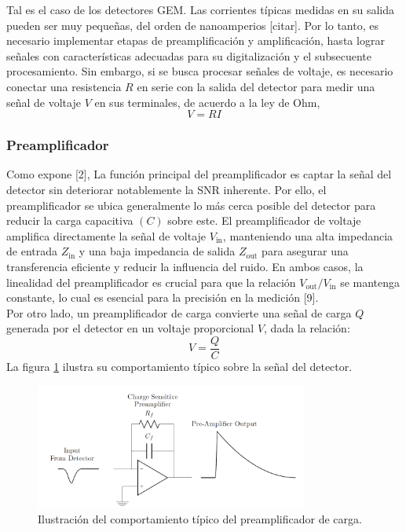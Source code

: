 \documentclass[]{book}
\begin{document}
\noindent Tal es el caso de los detectores GEM. Las corrientes típicas medidas en su salida pueden ser muy pequeñas, del orden de nanoamperios [citar]. Por lo tanto, es necesario implementar etapas de preamplificación y amplificación, hasta lograr señales con características adecuadas para su digitalización y el subsecuente procesamiento. Sin embargo, si se busca procesar señales de voltaje, es necesario conectar una resistencia $R$ en serie con la salida del detector para medir una señal de voltaje $V$ en sus terminales, de acuerdo a la ley de Ohm, $$V = R I$$ 

\subsubsection{Preamplificador}

\noindent Como expone [2], La función principal del preamplificador es captar la señal del detector sin deteriorar notablemente la SNR inherente. Por ello, el preamplificador se ubica generalmente lo más cerca posible del detector para reducir la carga capacitiva $(C)$ sobre este. El preamplificador de voltaje amplifica directamente la señal de voltaje $V_{\text{in}}$, manteniendo una alta impedancia de entrada $Z_{\text{in}}$ y una baja impedancia de salida $Z_{\text{out}}$ para asegurar una transferencia eficiente y reducir la influencia del ruido. En ambos casos, la linealidad del preamplificador es crucial para que la relación $V_{\text{out}}/ V_{\text{in}}$ se mantenga constante, lo cual es esencial para la precisión en la medición [9].\\

\noindent Por otro lado, un preamplificador de carga convierte una señal de carga $Q$ generada por el detector en un voltaje proporcional $V$, dada la relación: $$V = \frac{Q}{C}$$ La figura \ref{fig:preamp} ilustra su comportamiento típico sobre la señal del detector.\\

\begin{figure}[h]
    \centering
    \includegraphics[width=0.8\textwidth]{preamp.PNG}
    \caption{Ilustración del comportamiento típico del preamplificador de carga.}
    \label{fig:preamp}

\end{figure}
\end{document}
